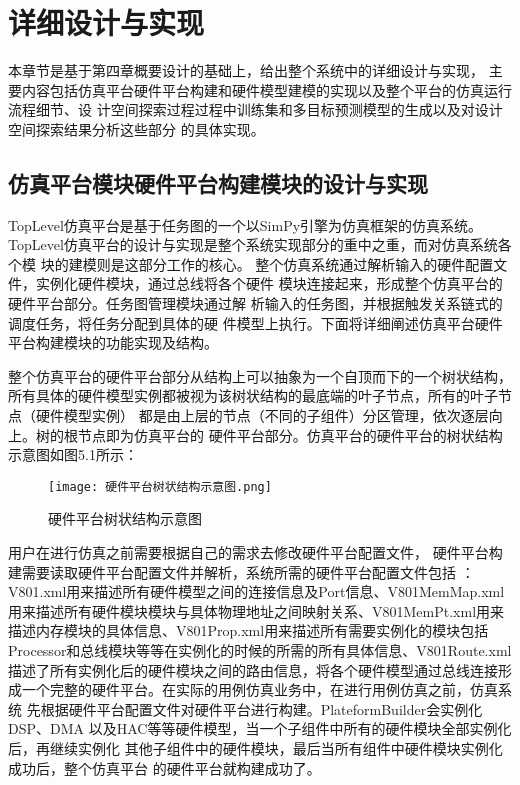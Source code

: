 
\chapter{详细设计与实现}
本章节是基于第四章概要设计的基础上，给出整个系统中的详细设计与实现，
主要内容包括仿真平台硬件平台构建和硬件模型建模的实现以及整个平台的仿真运行流程细节、设
计空间探索过程过程中训练集和多目标预测模型的生成以及对设计空间探索结果分析这些部分
的具体实现。

\section{仿真平台模块硬件平台构建模块的设计与实现}
TopLevel仿真平台是基于任务图的一个以SimPy引擎为仿真框架的仿真系统\cite{36}。
TopLevel仿真平台的设计与实现是整个系统实现部分的重中之重，而对仿真系统各个模
块的建模则是这部分工作的核心。
整个仿真系统通过解析输入的硬件配置文件，实例化硬件模块，通过总线将各个硬件
模块连接起来，形成整个仿真平台的硬件平台部分。任务图管理模块通过解
析输入的任务图，并根据触发关系链式的调度任务，将任务分配到具体的硬
件模型上执行。下面将详细阐述仿真平台硬件平台构建模块的功能实现及结构。

整个仿真平台的硬件平台部分从结构上可以抽象为一个自顶而下的一个树状结构，
所有具体的硬件模型实例都被视为该树状结构的最底端的叶子节点，所有的叶子节点（硬件模型实例）
都是由上层的节点（不同的子组件）分区管理，依次逐层向上。树的根节点即为仿真平台的
硬件平台部分。仿真平台的硬件平台的树状结构示意图如图5.1所示：

\begin{figure}
    \centering
    \texttt{[image: 硬件平台树状结构示意图.png]}
    \caption{硬件平台树状结构示意图}
    \label{fig:badge}
\end{figure}

用户在进行仿真之前需要根据自己的需求去修改硬件平台配置文件，
硬件平台构建需要读取硬件平台配置文件并解析，系统所需的硬件平台配置文件包括
：V801.xml用来描述所有硬件模型之间的连接信息及Port信息、V801MemMap.xml
用来描述所有硬件模块模块与具体物理地址之间映射关系、V801MemPt.xml用来
描述内存模块的具体信息、V801Prop.xml用来描述所有需要实例化的模块包括
Processor和总线模块等等在实例化的时候的所需的所有具体信息、V801Route.xml
描述了所有实例化后的硬件模块之间的路由信息，将各个硬件模型通过总线连接形
成一个完整的硬件平台。在实际的用例仿真业务中，在进行用例仿真之前，仿真系统
先根据硬件平台配置文件对硬件平台进行构建。PlateformBuilder会实例化DSP、DMA
以及HAC等等硬件模型，当一个子组件中所有的硬件模块全部实例化后，再继续实例化
其他子组件中的硬件模块，最后当所有组件中硬件模块实例化成功后，整个仿真平台
的硬件平台就构建成功了。

